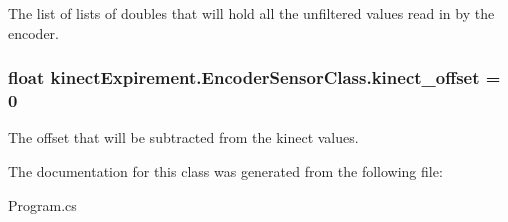 The list of lists of doubles that will hold all the unfiltered values read in by the encoder. 

\subsubsection[{\texorpdfstring{kinect\+\_\+offset}{kinect_offset}}]{\setlength{\rightskip}{0pt plus 5cm}float kinect\+Expirement.\+Encoder\+Sensor\+Class.\+kinect\+\_\+offset = 0\hspace{0.3cm}{\ttfamily [static]}}\hypertarget{classkinect_expirement_1_1_encoder_sensor_class_a70bb049741404bcfcce7e78a43739e33}{}\label{classkinect_expirement_1_1_encoder_sensor_class_a70bb049741404bcfcce7e78a43739e33}


The offset that will be subtracted from the kinect values. 



The documentation for this class was generated from the following file\+:\begin{DoxyCompactItemize}
\item 
Program.\+cs\end{DoxyCompactItemize}
